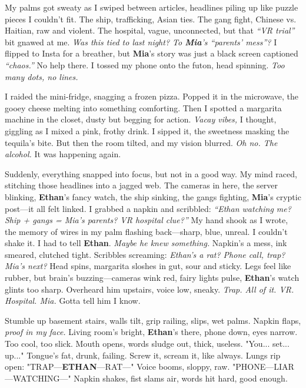 \documentclass{article}
\begin{document}
My palms got sweaty as I swiped between articles, headlines piling up like puzzle pieces I couldn’t fit. The ship, trafficking, Asian ties. The gang fight, Chinese vs. Haitian, raw and violent. The hospital, vague, unconnected, but that \textit{“VR trial”} bit gnawed at me. \textit{Was this tied to last night? To \textbf{Mia}’s “parents’ mess”?} I flipped to Insta for a breather, but \textbf{Mia}’s story was just a black screen captioned \textit{“chaos.”} No help there. I tossed my phone onto the futon, head spinning. \textit{Too many dots, no lines.}

I raided the mini-fridge, snagging a frozen pizza. Popped it in the microwave, the gooey cheese melting into something comforting. Then I spotted a margarita machine in the closet, dusty but begging for action. \textit{Vacay vibes,} I thought, giggling as I mixed a pink, frothy drink. I sipped it, the sweetness masking the tequila’s bite. But then the room tilted, and my vision blurred. \textit{Oh no. The alcohol.} It was happening again.

Suddenly, everything snapped into focus, but not in a good way. My mind raced, stitching those headlines into a jagged web. The cameras in here, the server blinking, \textbf{Ethan}’s fancy watch, the ship sinking, the gangs fighting, \textbf{Mia}’s cryptic post—it all felt linked. I grabbed a napkin and scribbled: \textit{“Ethan watching me? Ship + gangs = Mia’s parents? VR hospital clue?”} My hand shook as I wrote, the memory of wires in my palm flashing back—sharp, blue, unreal. I couldn’t shake it. I had to tell \textbf{Ethan}. \textit{Maybe he knew something.} Napkin’s a mess, ink smeared, clutched tight. Scribbles screaming: \textit{Ethan’s a rat? Phone call, trap? Mia’s next?} Head spins, margarita sloshes in gut, sour and sticky. Legs feel like rubber, but brain’s buzzing—cameras wink red, fairy lights pulse, \textbf{Ethan}’s watch glints too sharp. Overheard him upstairs, voice low, sneaky. \textit{Trap. All of it. VR. Hospital. Mia.} Gotta tell him I know.

Stumble up basement stairs, walls tilt, grip railing, slips, wet palms. Napkin flaps, \textit{proof in my face.} Living room’s bright, \textbf{Ethan}’s there, phone down, eyes narrow. Too cool, too slick. Mouth opens, words sludge out, thick, useless. "You... set... up..." Tongue’s fat, drunk, failing. Screw it, scream it, like always. Lungs rip open: "TRAP—\textbf{ETHAN}—RAT—" Voice booms, sloppy, raw. "PHONE—LIAR—WATCHING—" Napkin shakes, fist slams air, words hit hard, good enough.
\end{document}
